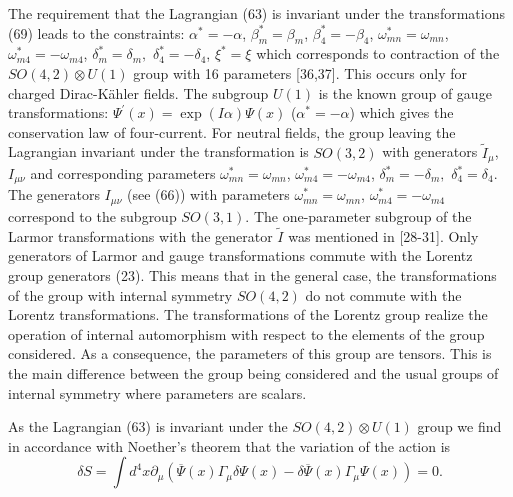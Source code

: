 \documentclass[a4paper,12pt]{article}
\begin{document}
The requirement that the Lagrangian (63) is invariant under the
transformations (69) leads to the constraints: $\alpha
^{*}=-\alpha $, $ \beta _m^{*}=\beta _m$, $\beta _4^{*}=-\beta
_4$, $\omega _{mn}^{*}=\omega _{mn}$, $\omega _{m4}^{*}=-\omega
_{m4}$, $\delta _m^{*}=\delta _m,$ $\delta _4^{*}=-\delta _4$,
$\xi ^{*}=\xi $ which corresponds to contraction of the $
SO(4,2)\otimes U(1)$ group with 16 parameters [36,37]. This occurs
only for charged Dirac-K\"ahler fields. The subgroup $U(1)$ is the
known group of gauge transformations: $\Psi ^{\prime }(x)=\exp
\left( I\alpha \right) \Psi (x)$ ($\alpha ^{*}=-\alpha $) which
gives the conservation law of four-current. For neutral fields,
the group leaving the Lagrangian invariant under the
transformation is $SO(3,2)$ with generators $\widetilde{I}_\mu $,
$ I_{\mu \nu }$ and corresponding parameters $\omega
_{mn}^{*}=\omega _{mn}$, $ \omega _{m4}^{*}=-\omega _{m4}$,
$\delta _m^{*}=-\delta _m,$ $\delta _4^{*}=\delta _4$. The
generators $I_{\mu \nu }$ (see (66)) with parameters $ \omega
_{mn}^{*}=\omega _{mn}$, $\omega _{m4}^{*}=-\omega _{m4}$
correspond to the subgroup $SO(3,1)$. The one-parameter subgroup
of the Larmor transformations with the generator $\widetilde{I}$
was mentioned in [28-31]. Only generators of Larmor and gauge
transformations commute with the Lorentz group generators (23).
This means that in the general case, the transformations of the
group with internal symmetry $SO(4,2)$ do not commute with the
Lorentz transformations. The transformations of the Lorentz group
realize the operation of internal automorphism with respect to the
elements of the group considered. As a consequence, the parameters
of this group are tensors. This is the main difference between the
group being considered and the usual groups of internal symmetry
where parameters are scalars.

As the Lagrangian (63) is invariant under the $SO(4,2)\otimes U(1)$ group we
find in accordance with Noether's theorem that the variation of the action
is
\begin{equation}
\delta S=\int d^4x\partial _\mu \left( \overline{\Psi }(x)\Gamma
_\mu \delta \Psi (x)-\delta \overline{\Psi }(x)\Gamma _\mu \Psi
(x)\right) =0 . \label{70}
\end{equation}
\end{document}
